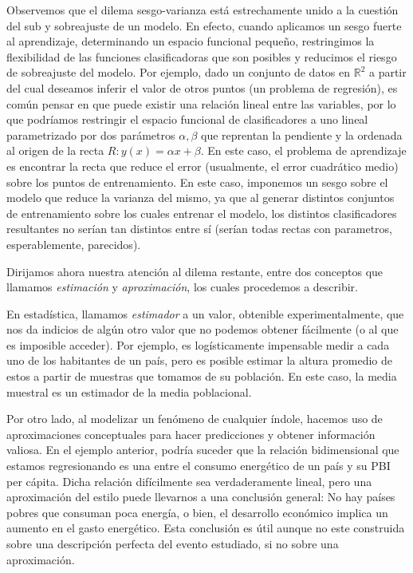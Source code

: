 \documentclass{report}
\begin{document}
Observemos que el dilema sesgo-varianza está estrechamente unido a la cuestión del sub y sobreajuste de un modelo. En efecto,
cuando aplicamos un sesgo fuerte al aprendizaje, determinando un espacio funcional pequeño, restringimos la flexibilidad de las
funciones clasificadoras que son posibles y reducimos el riesgo de sobreajuste del modelo. Por ejemplo, dado un conjunto
de datos en $\mathbb{R}^2$ a partir del cual deseamos inferir el valor de otros puntos (un problema de regresión), es común
pensar en que puede existir una relación lineal entre las variables, por lo que podríamos restringir el espacio funcional
de clasificadores a uno lineal parametrizado por dos parámetros $\alpha, \beta$ que reprentan la pendiente y la ordenada
al origen de la recta $R: y(x) = \alpha x + \beta$. En este caso, el problema de aprendizaje es encontrar la recta que reduce
el error (usualmente, el error cuadrático medio) sobre los puntos de entrenamiento. En este caso, imponemos un sesgo
sobre el modelo que reduce la varianza del mismo, ya que al generar distintos conjuntos de entrenamiento sobre los cuales
entrenar el modelo, los distintos clasificadores resultantes no serían tan distintos entre sí (serían todas rectas con parametros,
esperablemente, parecidos).\newline


Dirijamos ahora nuestra atención al dilema restante, entre dos conceptos que llamamos \textit{estimación} y \textit{aproximación}, 
los cuales procedemos a describir. 

En estadística, llamamos \textit{estimador} a un valor, obtenible experimentalmente, que nos da indicios
de algún otro valor que no podemos obtener fácilmente (o al que es imposible acceder). Por ejemplo, es logísticamente impensable
medir a cada uno de los habitantes de un país, pero es posible estimar la altura promedio de estos a partir de muestras que tomamos
de su población. En este caso, la media muestral es un estimador de la media poblacional. 

Por otro lado, al modelizar un fenómeno de cualquier índole, hacemos uso de aproximaciones conceptuales para
hacer predicciones y obtener información valiosa. En el ejemplo anterior, podría suceder que la relación bidimensional que estamos
regresionando es una entre el consumo energético de un país y su PBI per cápita. Dicha relación difícilmente sea verdaderamente lineal,
pero una aproximación del estilo puede llevarnos a una conclusión general: No hay países pobres que consuman poca energía, o bien,
el desarrollo económico implica un aumento en el gasto energético. Esta conclusión es útil aunque no este construida sobre una descripción
perfecta del evento estudiado, si no sobre una aproximación.
\end{document}
